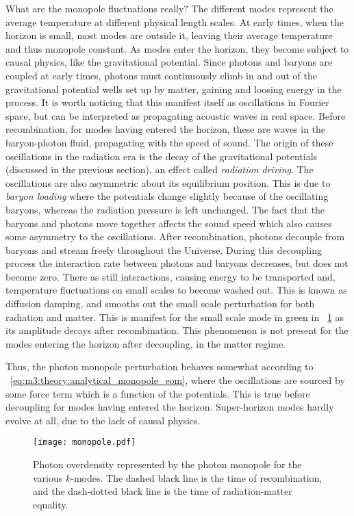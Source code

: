     What are the monopole fluctuations really? The different modes represent the average temperature at different physical length scales. At early times, when the horizon is small, most modes are outside it, leaving their average temperature and thus monopole constant. As modes enter the horizon, they become subject to causal physics, like the gravitational potential. Since photons and baryons are coupled at early times, photons must continuously climb in and out of the gravitational potential wells set up by matter, gaining and loosing energy in the process. It is worth noticing that this manifest itself as oscillations in Fourier space, but can be interpreted as propagating acoustic waves in real space. Before recombination, for modes having entered the horizon, these are waves in the baryon-photon fluid, propagating with the speed of sound. The origin of these oscillations in the radiation era is the decay of the gravitational potentials (discussed in the previous section), an effect called \textit{radiation driving}. The oscillations are also asymmetric about its equilibrium position. This is due to \textit{baryon loading} where the potentials change slightly because of the oscillating baryons, whereas the radiation pressure is left unchanged. The fact that the baryons and photons move together affects the sound speed which also causes some asymmetry to the oscillations. After recombination, photons decouple from baryons and stream freely throughout the Universe. During this decoupling process the interaction rate between photons and baryons decreases, but does not become zero. There as still interactions, causing energy to be transported and, temperature fluctuations on small scales to become washed out. This is known as diffusion damping, and smooths out the small scale perturbation for both radiation and matter. This is manifest for the small scale mode in green in ~\cref{fig:m3:monopole} as its amplitude decays after recombination. This phenomenon is not present for the modes entering the horizon after decoupling, in the matter regime. 

    Thus, the photon monopole perturbation behaves somewhat according to ~\cref{eq:m3:theory:analytical_monopole_eom}, where the oscillations are sourced by some force term which is a function of the potentials. This is true before decoupling for modes having entered the horizon. Super-horizon modes hardly evolve at all, due to the lack of causal physics.
    \begin{figure}
        \texttt{[image: monopole.pdf]}
        \caption{Photon overdensity represented by the photon monopole for the various $k$-modes. The dashed black line is the time of recombination, and the dash-dotted black line is the time of radiation-matter equality.}
        \label{fig:m3:monopole}
    \end{figure}

